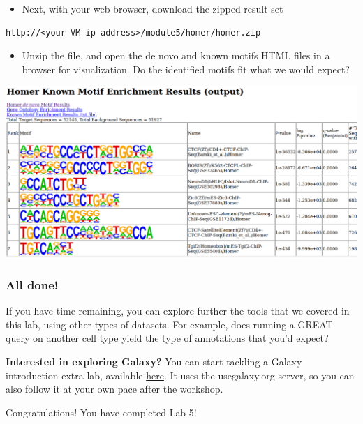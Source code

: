 \documentclass[
]{book}
\providecommand{\tightlist}{%
  \setlength{\itemsep}{0pt}\setlength{\parskip}{0pt}}
\begin{document}
\begin{itemize}
\tightlist
\item
  Next, with your web browser, download the zipped result set
\end{itemize}

\begin{verbatim}
http://<your VM ip address>/module5/homer/homer.zip
\end{verbatim}

\begin{itemize}
\tightlist
\item
  Unzip the file, and open the de novo and known motifs HTML files in a browser for visualization. Do the identified motifs fit what we would expect?
\end{itemize}

\includegraphics{./img/HOMER_results.png}

\subsubsection{All done!}\label{all-done}

If you have time remaining, you can explore further the tools that we covered in this lab, using other types of datasets. For example, does running a GREAT query on another cell type yield the type of annotations that you'd expect?

\textbf{Interested in exploring Galaxy?} You can start tackling a Galaxy introduction extra lab, available \href{https://bioinformaticsdotca.github.io/EPI_2023_module5_galaxy}{here}. It uses the usegalaxy.org server, so you can also follow it at your own pace after the workshop.

Congratulations! You have completed Lab 5!

  
\end{document}
